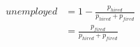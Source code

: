 \documentclass[preview]{standalone}
\begin{document}
\begin{align*}
unemployed &= 1 - \frac{p_{hired}}{p_{hired} + p_{fired}}\\ &= \frac{p_{fired}}{p_{hired} + p_{fired}}
\end{align*}
\end{document}

